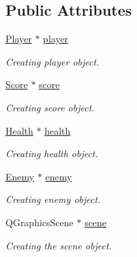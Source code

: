 \subsection*{Public Attributes}
\begin{DoxyCompactItemize}
\item 
\hyperlink{class_player}{Player} $\ast$ \hyperlink{class_game_abec70aa1c0269a9a7e171af4d79e08bf}{player}\hypertarget{class_game_abec70aa1c0269a9a7e171af4d79e08bf}{}\label{class_game_abec70aa1c0269a9a7e171af4d79e08bf}

\begin{DoxyCompactList}\small\item\em Creating player object. \end{DoxyCompactList}\item 
\hyperlink{class_score}{Score} $\ast$ \hyperlink{class_game_ad195acc6b5ee17a5a07fea0b7b4ff5e2}{score}\hypertarget{class_game_ad195acc6b5ee17a5a07fea0b7b4ff5e2}{}\label{class_game_ad195acc6b5ee17a5a07fea0b7b4ff5e2}

\begin{DoxyCompactList}\small\item\em Creating score object. \end{DoxyCompactList}\item 
\hyperlink{class_health}{Health} $\ast$ \hyperlink{class_game_a4cfa8ef83412c73d759b3965804f42aa}{health}\hypertarget{class_game_a4cfa8ef83412c73d759b3965804f42aa}{}\label{class_game_a4cfa8ef83412c73d759b3965804f42aa}

\begin{DoxyCompactList}\small\item\em Creating health object. \end{DoxyCompactList}\item 
\hyperlink{class_enemy}{Enemy} $\ast$ \hyperlink{class_game_aaaef99ac0f9bb6fc836e8195b0ea8756}{enemy}\hypertarget{class_game_aaaef99ac0f9bb6fc836e8195b0ea8756}{}\label{class_game_aaaef99ac0f9bb6fc836e8195b0ea8756}

\begin{DoxyCompactList}\small\item\em Creating enemy object. \end{DoxyCompactList}\item 
Q\+Graphics\+Scene $\ast$ \hyperlink{class_game_a8119e3b9a632906c6808fa294b46a92a}{scene}\hypertarget{class_game_a8119e3b9a632906c6808fa294b46a92a}{}\label{class_game_a8119e3b9a632906c6808fa294b46a92a}

\begin{DoxyCompactList}\small\item\em Creating the scene object. \end{DoxyCompactList}\end{DoxyCompactItemize}


